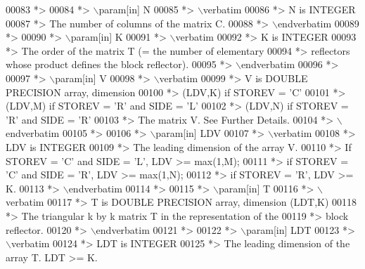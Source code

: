 \begin{DoxyCode}
00083 \textcolor{comment}{*>}
00084 \textcolor{comment}{*> \(\backslash\)param[in] N}
00085 \textcolor{comment}{*> \(\backslash\)verbatim}
00086 \textcolor{comment}{*>          N is INTEGER}
00087 \textcolor{comment}{*>          The number of columns of the matrix C.}
00088 \textcolor{comment}{*> \(\backslash\)endverbatim}
00089 \textcolor{comment}{*>}
00090 \textcolor{comment}{*> \(\backslash\)param[in] K}
00091 \textcolor{comment}{*> \(\backslash\)verbatim}
00092 \textcolor{comment}{*>          K is INTEGER}
00093 \textcolor{comment}{*>          The order of the matrix T (= the number of elementary}
00094 \textcolor{comment}{*>          reflectors whose product defines the block reflector).}
00095 \textcolor{comment}{*> \(\backslash\)endverbatim}
00096 \textcolor{comment}{*>}
00097 \textcolor{comment}{*> \(\backslash\)param[in] V}
00098 \textcolor{comment}{*> \(\backslash\)verbatim}
00099 \textcolor{comment}{*>          V is DOUBLE PRECISION array, dimension}
00100 \textcolor{comment}{*>                                (LDV,K) if STOREV = 'C'}
00101 \textcolor{comment}{*>                                (LDV,M) if STOREV = 'R' and SIDE = 'L'}
00102 \textcolor{comment}{*>                                (LDV,N) if STOREV = 'R' and SIDE = 'R'}
00103 \textcolor{comment}{*>          The matrix V. See Further Details.}
00104 \textcolor{comment}{*> \(\backslash\)endverbatim}
00105 \textcolor{comment}{*>}
00106 \textcolor{comment}{*> \(\backslash\)param[in] LDV}
00107 \textcolor{comment}{*> \(\backslash\)verbatim}
00108 \textcolor{comment}{*>          LDV is INTEGER}
00109 \textcolor{comment}{*>          The leading dimension of the array V.}
00110 \textcolor{comment}{*>          If STOREV = 'C' and SIDE = 'L', LDV >= max(1,M);}
00111 \textcolor{comment}{*>          if STOREV = 'C' and SIDE = 'R', LDV >= max(1,N);}
00112 \textcolor{comment}{*>          if STOREV = 'R', LDV >= K.}
00113 \textcolor{comment}{*> \(\backslash\)endverbatim}
00114 \textcolor{comment}{*>}
00115 \textcolor{comment}{*> \(\backslash\)param[in] T}
00116 \textcolor{comment}{*> \(\backslash\)verbatim}
00117 \textcolor{comment}{*>          T is DOUBLE PRECISION array, dimension (LDT,K)}
00118 \textcolor{comment}{*>          The triangular k by k matrix T in the representation of the}
00119 \textcolor{comment}{*>          block reflector.}
00120 \textcolor{comment}{*> \(\backslash\)endverbatim}
00121 \textcolor{comment}{*>}
00122 \textcolor{comment}{*> \(\backslash\)param[in] LDT}
00123 \textcolor{comment}{*> \(\backslash\)verbatim}
00124 \textcolor{comment}{*>          LDT is INTEGER}
00125 \textcolor{comment}{*>          The leading dimension of the array T. LDT >= K.}

\end{DoxyCode}
